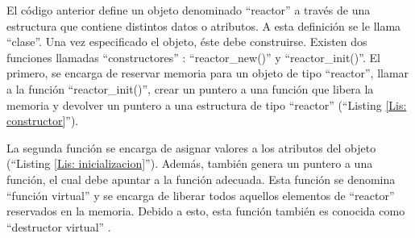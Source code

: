 

El código anterior define un objeto denominado ``reactor'' a través de una estructura que contiene distintos datos o atributos. A esta definición se le llama ``clase''. Una vez especificado el objeto, éste debe construirse. Existen dos funciones llamadas ``constructores'' \citep[pág. 93--95]{tallerRPi}: ``reactor\_new()'' y ``reactor\_init()''. El primero, se encarga de reservar memoria para un objeto de tipo ``reactor'', llamar a la función ``reactor\_init()'', crear un puntero a una función que libera la memoria y devolver un puntero a una estructura de tipo ``reactor'' (``Listing \ref{Lis: constructor}''). 




La segunda función se encarga de asignar valores a los atributos del objeto (``Listing \ref{Lis: inicializacion}''). Además, también genera un puntero a una función, el cual debe apuntar a la función adecuada. Esta función se denomina ``función virtual'' y se encarga de liberar todos aquellos elementos de ``reactor'' reservados en la memoria. Debido a esto, esta función también es conocida como ``destructor virtual'' \citep[pág. 93--95]{tallerRPi}.


